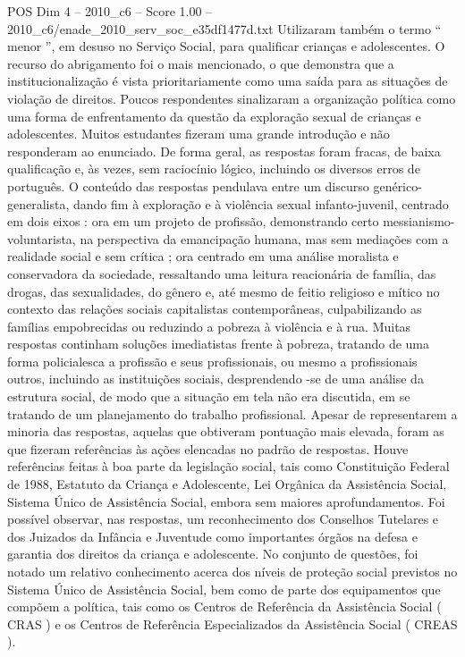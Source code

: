 \begin{textsample}{POS Dim 4 – 2010\_c6 – Score 1.00 – 2010\_c6/enade\_2010\_serv\_soc\_e35df1477d.txt}
Utilizaram também o termo “ menor ”, em desuso no Serviço Social, para qualificar crianças e adolescentes.
O recurso do abrigamento foi o mais mencionado, o que demonstra que a institucionalização é vista prioritariamente como uma saída para as situações de violação de direitos.
Poucos respondentes sinalizaram a organização política como uma forma de enfrentamento da questão da exploração sexual de crianças e adolescentes.
Muitos estudantes fizeram uma grande introdução e não responderam ao enunciado.
De forma geral, as respostas foram fracas, de baixa qualificação e, às vezes, sem raciocínio lógico, incluindo os diversos erros de português.
O conteúdo das respostas pendulava entre um discurso genérico-generalista, dando fim à exploração e à violência sexual infanto-juvenil, centrado em dois eixos : ora em um projeto de profissão, demonstrando certo messianismo-voluntarista, na perspectiva da emancipação humana, mas sem mediações com a realidade social e sem crítica ; ora centrado em uma análise moralista e conservadora da sociedade, ressaltando uma leitura reacionária de família, das drogas, das sexualidades, do gênero e, até mesmo de feitio religioso e mítico no contexto das relações sociais capitalistas contemporâneas, culpabilizando as famílias empobrecidas ou reduzindo a pobreza à violência e à rua.
Muitas respostas continham soluções imediatistas frente à pobreza, tratando de uma forma policialesca a profissão e seus profissionais, ou mesmo a profissionais outros, incluindo as instituições sociais, desprendendo -se de uma análise da estrutura social, de modo que a situação em tela não era discutida, em se tratando de um planejamento do trabalho profissional.
Apesar de representarem a minoria das respostas, aquelas que obtiveram pontuação mais elevada, foram as que fizeram referências às ações elencadas no padrão de respostas.
Houve referências feitas à boa parte da legislação social, tais como Constituição Federal de 1988, Estatuto da Criança e Adolescente, Lei Orgânica da Assistência Social, Sistema Único de Assistência Social, embora sem maiores aprofundamentos.
Foi possível observar, nas respostas, um reconhecimento dos Conselhos Tutelares e dos Juizados da Infância e Juventude como importantes órgãos na defesa e garantia dos direitos da criança e adolescente.
No conjunto de questões, foi notado um relativo conhecimento acerca dos níveis de proteção social previstos no Sistema Único de Assistência Social, bem como de parte dos equipamentos que compõem a política, tais como os Centros de Referência da Assistência Social ( CRAS ) e os Centros de Referência Especializados da Assistência Social ( CREAS ).

\end{textsample}
